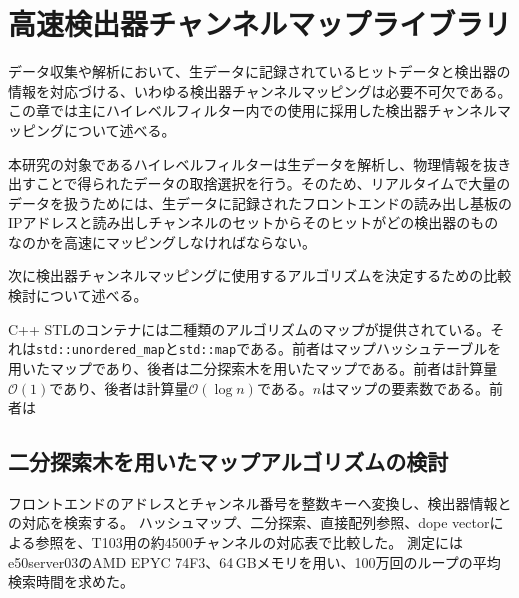 \documentclass[../main.tex]{subfiles}
\begin{document}
\clearpage
\appendix
\section{高速検出器チャンネルマップライブラリ}
\label{sec:appendixA}

データ収集や解析において、生データに記録されているヒットデータと検出器の情報を対応づける、いわゆる検出器チャンネルマッピングは必要不可欠である。この章では主にハイレベルフィルター内での使用に採用した検出器チャンネルマッピングについて述べる。

本研究の対象であるハイレベルフィルターは生データを解析し、物理情報を抜き出すことで得られたデータの取捨選択を行う。そのため、リアルタイムで大量のデータを扱うためには、生データに記録されたフロントエンドの読み出し基板のIPアドレスと読み出しチャンネルのセットからそのヒットがどの検出器のものなのかを高速にマッピングしなければならない。

次に検出器チャンネルマッピングに使用するアルゴリズムを決定するための比較検討について述べる。

C++ STLのコンテナには二種類のアルゴリズムのマップが提供されている。それは\lstinline|std::unordered_map|と\lstinline|std::map|である。前者はマップハッシュテーブルを用いたマップであり、後者は二分探索木を用いたマップである。前者は計算量$\mathcal{O}(1)$であり、後者は計算量$\mathcal{O}(\log n)$である。$n$はマップの要素数である。前者は


\subsection{二分探索木を用いたマップアルゴリズムの検討}
フロントエンドのアドレスとチャンネル番号を整数キーへ変換し、検出器情報との対応を検索する。
ハッシュマップ、二分探索、直接配列参照、dope vectorによる参照を、T103用の約4500チャンネルの対応表で比較した。
測定にはe50server03のAMD EPYC 74F3、64\,GBメモリを用い、100万回のループの平均検索時間を求めた\cite{kashima:channel2026}。
\end{document}
